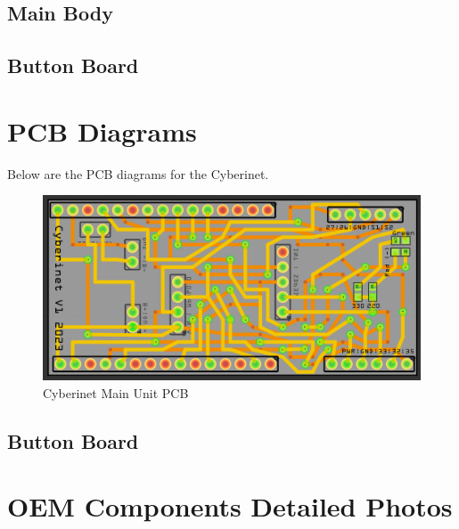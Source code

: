 \subsection{Main Body}



\subsection{Button Board}




\section{PCB Diagrams}
Below are the PCB diagrams for the Cyberinet.


\begin{center}
\begin{figure}
    \centering
    \includegraphics[scale=0.3]{diagrams/PCBs/mainBoard.png}
    \caption{Cyberinet Main Unit PCB}
    \label{fig:mainPCB}
\end{figure}
\end{center}

\subsection{Button Board}


\section{OEM Components Detailed Photos}

